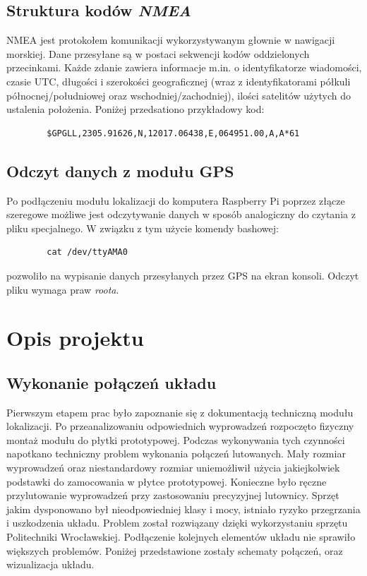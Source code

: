 \documentclass{article}
\begin{document}
	\subsection{Struktura kodów \textit{NMEA}}
		NMEA jest protokołem komunikacji wykorzystywanym głownie w nawigacji morskiej. Dane przesyłane są w postaci sekwencji kodów oddzielonych przecinkami. Każde zdanie zawiera informacje m.in. o identyfikatorze wiadomości, czasie UTC, długości i szerokości geograficznej (wraz z identyfikatorami półkuli północnej/południowej oraz wschodniej/zachodniej),  ilości satelitów użytych do ustalenia położenia. Poniżej przedsationo przykładowy kod:
		\begin{verbatim}
		$GPGLL,2305.91626,N,12017.06438,E,064951.00,A,A*61
		\end{verbatim}
    \subsection{Odczyt danych z modułu GPS }    
	   Po podłączeniu modułu lokalizacji do komputera Raspberry Pi poprzez złącze szeregowe możliwe jest odczytywanie danych w sposób analogiczny do czytania z pliku specjalnego. W związku z tym użycie komendy bashowej:
	   	\begin{verbatim}
	   	cat /dev/ttyAMA0
	   	\end{verbatim} 
	   	pozwoliło na wypisanie danych przesyłanych przez GPS na ekran konsoli. Odczyt pliku wymaga praw \textit{roota}.
\section{Opis projektu}
	\subsection{Wykonanie połączeń układu}
		Pierwszym etapem prac było zapoznanie się z dokumentacją techniczną modułu lokalizacji. Po przeanalizowaniu odpowiednich wyprowadzeń rozpoczęto fizyczny montaż modułu do płytki prototypowej. Podczas wykonywania tych czynności napotkano techniczny problem wykonania połączeń lutowanych. Mały rozmiar wyprowadzeń oraz niestandardowy rozmiar uniemożliwił użycia jakiejkolwiek podstawki do zamocowania w płytce prototypowej. Konieczne było ręczne przylutowanie wyprowadzeń przy zastosowaniu precyzyjnej lutownicy. Sprzęt jakim dysponowano był nieodpowiedniej klasy i mocy, istniało ryzyko przegrzania i uszkodzenia układu. Problem został rozwiązany dzięki wykorzystaniu sprzętu Politechniki Wrocławskiej. Podłączenie kolejnych elementów układu nie sprawiło większych problemów. Poniżej przedstawione zostały schematy połączeń, oraz wizualizacja układu.
			    
\end{document}
